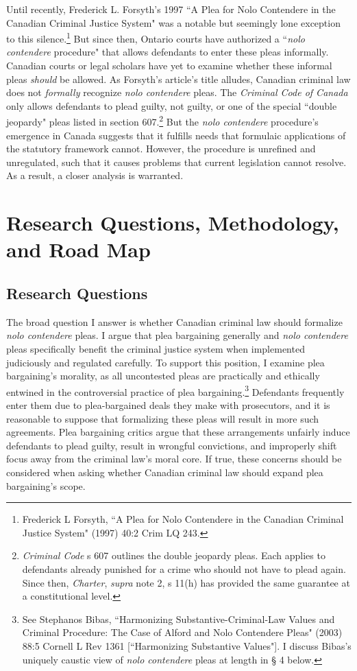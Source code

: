 Until recently, Frederick L. Forsyth's 1997 ``A Plea for Nolo Contendere in the Canadian Criminal Justice System" was a notable but seemingly lone exception to this silence.\footnote{Frederick L Forsyth, ``A Plea for Nolo Contendere in the Canadian Criminal Justice System" (1997) 40:2 Crim LQ 243.} But since then, Ontario courts have authorized a ``\textit{nolo contendere} procedure" that allows defendants to enter these pleas informally. Canadian courts or legal scholars have yet to examine whether these informal pleas \textit{should} be allowed. As Forsyth's article's title alludes, Canadian criminal law does not \textit{formally} recognize \textit{nolo contendere} pleas. The \textit{Criminal Code of Canada} only allows defendants to plead guilty, not guilty, or one of the special ``double jeopardy" pleas listed in section 607.\footnote{\textit{Criminal Code} s 607 outlines the double jeopardy pleas. Each applies to defendants already punished for a crime who should not have to plead again. Since then, \textit{Charter}, \textit{supra} note 2, s 11(h) has provided the same guarantee at a constitutional level.} But the \textit{nolo contendere} procedure's emergence in Canada suggests that it fulfills needs that formulaic applications of the statutory framework cannot. However, the procedure is unrefined and unregulated, such that it causes problems that current legislation cannot resolve. As a result, a closer analysis is warranted.

\section{Research Questions, Methodology, and Road Map}

\subsection{Research Questions}

The broad question I answer is whether Canadian criminal law should formalize \textit{nolo contendere} pleas. I argue that plea bargaining generally and \textit{nolo contendere} pleas specifically benefit the criminal justice system when implemented judiciously and regulated carefully. To support this position, I examine plea bargaining's morality, as all uncontested pleas are practically and ethically entwined in the controversial practice of plea bargaining.\footnote{See Stephanos Bibas, ``Harmonizing Substantive-Criminal-Law Values and Criminal Procedure:
The Case of Alford and Nolo Contendere Pleas" (2003) 88:5 Cornell L Rev 1361 [``Harmonizing Substantive Values"]. I discuss Bibas's uniquely caustic view of \textit{nolo contendere} pleas at length in § 4 below.} Defendants frequently enter them due to plea-bargained deals they make with prosecutors, and it is reasonable to suppose that formalizing these pleas will result in more such agreements. Plea bargaining critics argue that these arrangements unfairly induce defendants to plead guilty, result in wrongful convictions, and improperly shift focus away from the criminal law's moral core. If true, these concerns should be considered when asking whether Canadian criminal law should expand plea bargaining's scope.

